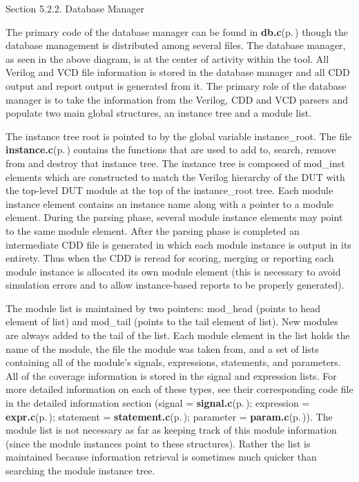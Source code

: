 \begin{Desc}
\item[Section 5.2.2. Database Manager]\end{Desc}
\begin{Desc}
\item[]The primary code of the database manager can be found in {\bf db.c}{\rm (p.\,\pageref{db_8c})} though the database management is distributed among several files. The database manager, as seen in the above diagram, is at the center of activity within the tool. All Verilog and VCD file information is stored in the database manager and all CDD output and report output is generated from it. The primary role of the database manager is to take the information from the Verilog, CDD and VCD parsers and populate two main global structures, an instance tree and a module list.\end{Desc}
\begin{Desc}
\item[]The instance tree root is pointed to by the global variable instance\_\-root. The file {\bf instance.c}{\rm (p.\,\pageref{instance_8c})} contains the functions that are used to add to, search, remove from and destroy that instance tree. The instance tree is composed of mod\_\-inst elements which are constructed to match the Verilog hierarchy of the DUT with the top-level DUT module at the top of the instance\_\-root tree. Each module instance element contains an instance name along with a pointer to a module element. During the parsing phase, several module instance elements may point to the same module element. After the parsing phase is completed an intermediate CDD file is generated in which each module instance is output in its entirety. Thus when the CDD is reread for scoring, merging or reporting each module instance is allocated its own module element (this is necessary to avoid simulation errors and to allow instance-based reports to be properly generated).\end{Desc}
\begin{Desc}
\item[]The module list is maintained by two pointers: mod\_\-head (points to head element of list) and mod\_\-tail (points to the tail element of list). New modules are always added to the tail of the list. Each module element in the list holds the name of the module, the file the module was taken from, and a set of lists containing all of the module's signals, expressions, statements, and parameters. All of the coverage information is stored in the signal and expression lists. For more detailed information on each of these types, see their corresponding code file in the detailed information section (signal = {\bf signal.c}{\rm (p.\,\pageref{signal_8c})}; expression = {\bf expr.c}{\rm (p.\,\pageref{expr_8c})}; statement = {\bf statement.c}{\rm (p.\,\pageref{statement_8c})}; parameter = {\bf param.c}{\rm (p.\,\pageref{param_8c})}). The module list is not necessary as far as keeping track of this module information (since the module instances point to these structures). Rather the list is maintained because information retrieval is sometimes much quicker than searching the module instance tree.\end{Desc}
